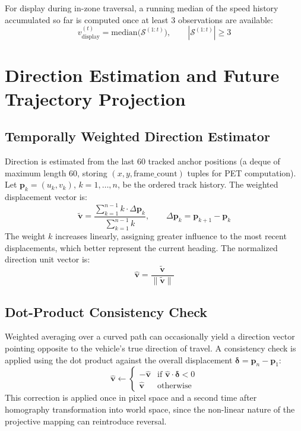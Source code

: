\documentclass[12pt]{report}
\begin{document}
For display during in-zone traversal, a running median of the speed history accumulated so far is computed once at least 3 observations are available:
\begin{equation}
    v_\text{display}^{(t)} = \text{median}\bigl(\mathcal{S}^{(1:t)}\bigr), \qquad |\mathcal{S}^{(1:t)}| \geq 3
    \label{eq:running_median}
\end{equation}

\section{Direction Estimation and Future Trajectory Projection}

\subsection{Temporally Weighted Direction Estimator}

Direction is estimated from the last 60 tracked anchor positions (a deque of maximum length 60, storing $(x, y, \text{frame\_count})$ tuples for PET computation).
Let $\mathbf{p}_k = (u_k, v_k)$, $k = 1, \ldots, n$, be the ordered track history.
The weighted displacement vector is:
\begin{equation}
    \tilde{\mathbf{v}} = \frac{\sum_{k=1}^{n-1} k \cdot \Delta\mathbf{p}_k}{\sum_{k=1}^{n-1} k},
    \qquad
    \Delta\mathbf{p}_k = \mathbf{p}_{k+1} - \mathbf{p}_k
    \label{eq:weighted_direction}
\end{equation}
The weight $k$ increases linearly, assigning greater influence to the most recent displacements, which better represent the current heading.
The normalized direction unit vector is:
\begin{equation}
    \hat{\mathbf{v}} = \frac{\tilde{\mathbf{v}}}{\|\tilde{\mathbf{v}}\|}
    \label{eq:unit_direction}
\end{equation}

\subsection{Dot-Product Consistency Check}

Weighted averaging over a curved path can occasionally yield a direction vector pointing opposite to the vehicle's true direction of travel.
A consistency check is applied using the dot product against the overall displacement $\boldsymbol{\delta} = \mathbf{p}_n - \mathbf{p}_1$:
\begin{equation}
    \hat{\mathbf{v}} \leftarrow
    \begin{cases}
        -\hat{\mathbf{v}} & \text{if } \hat{\mathbf{v}} \cdot \boldsymbol{\delta} < 0 \\
        \hat{\mathbf{v}} & \text{otherwise}
    \end{cases}
    \label{eq:dot_check}
\end{equation}
This correction is applied once in pixel space and a second time after homography transformation into world space, since the non-linear nature of the projective mapping can reintroduce reversal.
\end{document}
